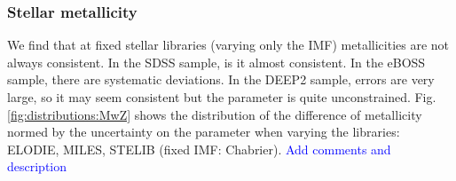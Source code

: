\documentclass[onecolumn]{aa}
\begin{document}
% 

\subsubsection{Stellar metallicity}
\label{subsec:res:metal}


We find that at fixed stellar libraries (varying only the IMF) metallicities are not always consistent. 
In the SDSS sample, is it almost consistent. In the eBOSS sample, there are systematic deviations. In the DEEP2 sample, errors are very large, so it may seem consistent but the parameter is quite unconstrained.
Fig. \ref{fig:distributions:MwZ} shows the distribution of the difference of metallicity normed by the uncertainty on the parameter when varying the libraries: ELODIE, MILES, STELIB (fixed IMF: Chabrier).
\textcolor{blue}{Add comments and description}
\end{document}
